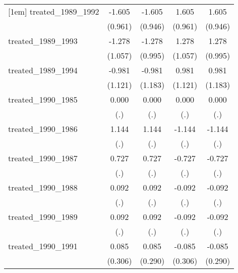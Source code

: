 {\begin{tabular}{l*{4}{c}}
[1em]
treated\_1989\_1992&      -1.605         &      -1.605         &       1.605         &       1.605         \\
            &     (0.961)         &     (0.946)         &     (0.961)         &     (0.946)         \\
[1em]
treated\_1989\_1993&      -1.278         &      -1.278         &       1.278         &       1.278         \\
            &     (1.057)         &     (0.995)         &     (1.057)         &     (0.995)         \\
[1em]
treated\_1989\_1994&      -0.981         &      -0.981         &       0.981         &       0.981         \\
            &     (1.121)         &     (1.183)         &     (1.121)         &     (1.183)         \\
[1em]
treated\_1990\_1985&       0.000         &       0.000         &       0.000         &       0.000         \\
            &         (.)         &         (.)         &         (.)         &         (.)         \\
[1em]
treated\_1990\_1986&       1.144         &       1.144         &      -1.144         &      -1.144         \\
            &         (.)         &         (.)         &         (.)         &         (.)         \\
[1em]
treated\_1990\_1987&       0.727         &       0.727         &      -0.727         &      -0.727         \\
            &         (.)         &         (.)         &         (.)         &         (.)         \\
[1em]
treated\_1990\_1988&       0.092         &       0.092         &      -0.092         &      -0.092         \\
            &         (.)         &         (.)         &         (.)         &         (.)         \\
[1em]
treated\_1990\_1989&       0.092         &       0.092         &      -0.092         &      -0.092         \\
            &         (.)         &         (.)         &         (.)         &         (.)         \\
[1em]
treated\_1990\_1991&       0.085         &       0.085         &      -0.085         &      -0.085         \\
            &     (0.306)         &     (0.290)         &     (0.306)         &     (0.290)         \\

\end{tabular}}
